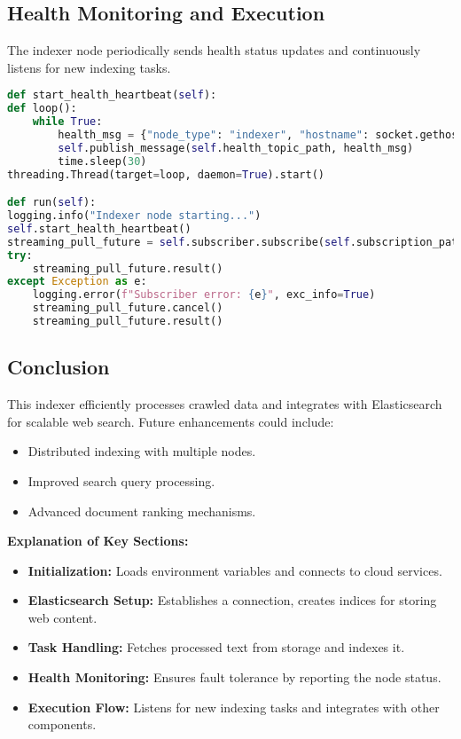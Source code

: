 \documentclass[12pt,a4paper]{report}
\begin{document}
\subsection{Health Monitoring and Execution}
The indexer node periodically sends health status updates and continuously listens for new indexing tasks.
\begin{lstlisting}[language=Python]
def start_health_heartbeat(self):
def loop():
    while True:
        health_msg = {"node_type": "indexer", "hostname": socket.gethostname(), "status": "online"}
        self.publish_message(self.health_topic_path, health_msg)
        time.sleep(30)
threading.Thread(target=loop, daemon=True).start()

def run(self):
logging.info("Indexer node starting...")
self.start_health_heartbeat()
streaming_pull_future = self.subscriber.subscribe(self.subscription_path, callback=self.process_indexing_task)
try:
    streaming_pull_future.result()
except Exception as e:
    logging.error(f"Subscriber error: {e}", exc_info=True)
    streaming_pull_future.cancel()
    streaming_pull_future.result()
\end{lstlisting}

\subsection{Conclusion}
This indexer efficiently processes crawled data and integrates with Elasticsearch for scalable web search. Future enhancements could include:
\begin{itemize}
\item Distributed indexing with multiple nodes.
\item Improved search query processing.
\item Advanced document ranking mechanisms.
\end{itemize}
\textbf{Explanation of Key Sections:}
\begin{itemize}
\item \textbf{Initialization:} Loads environment variables and connects to cloud services.
\item \textbf{Elasticsearch Setup:} Establishes a connection, creates indices for storing web content.
\item \textbf{Task Handling:} Fetches processed text from storage and indexes it.
\item \textbf{Health Monitoring:} Ensures fault tolerance by reporting the node status.
\item \textbf{Execution Flow:} Listens for new indexing tasks and integrates with other components.
\end{itemize}
\end{document}
